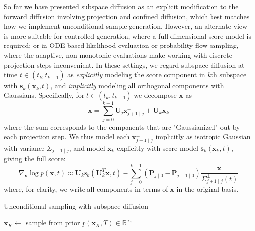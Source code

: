 \documentclass{article}
\begin{document}
So far we have presented subspace diffusion as an explicit modification to the forward diffusion involving projection and confined diffusion, which best matches how we implement unconditional sample generation. However, an alternate view is more suitable for controlled generation, where a full-dimensional score model is required; or in ODE-based likelihood evaluation or probability flow sampling, where the adaptive, non-monotonic evaluations make working with discrete projection steps inconvenient. In these settings, we regard subspace diffusion at time $t \in (t_k, t_{k+1})$ as \emph{explicitly} modeling the score component in $k$th subspace with $\mathbf{s}_k(\mathbf{x}_k, t)$, and \emph{implicitly} modeling all orthogonal components with Gaussians. Specifically, for $t \in (t_k, t_{k+1})$ we decompose $\mathbf{x}$ as
\begin{equation} \label{eq:decomp}
    \mathbf{x} = \sum_{j=0}^{k-1} \mathbf{U}_j \mathbf{x}^\perp_{j+1 \mid j} + \mathbf{U}_k\mathbf{x}_k
\end{equation}
where the sum corresponds to the components that are "Gaussianized" out by each projection step. We thus model each $\mathbf{x}^\perp_{j+1 \mid j}$ implicitly as isotropic Gaussian with variance $\Sigma^\perp_{j+1\mid j}$, and model $\mathbf{x}_k$ explicitly with score model $\mathbf{s}_k(\mathbf{x}_k, t)$, giving the full score:
\begin{equation} \label{eq:full-score}
    \nabla_\mathbf{x}\log p(\mathbf{x}, t) \approx \mathbf{U}_k\mathbf{s}_k(\mathbf{U}_k^T\mathbf{x}, t) - \sum_{j=0}^{k-1} \left(\mathbf{P}_{j\mid 0}-\mathbf{P}_{j+1 \mid 0}\right)\frac{\mathbf{x}}{\Sigma^\perp_{j+1\mid j}(t)}
\end{equation}
where, for clarity, we write all components in terms of $\mathbf{x}$ in the original basis.

\begin{algorithm}[t]
\caption{Unconditional sampling with subspace diffusion}\label{alg:sampling}
$\mathbf{x}_K \gets $ sample from prior $p(\mathbf{x}_K, T) \in \mathbb{R}^{n_K}$\;
\end{algorithm}
\end{document}
